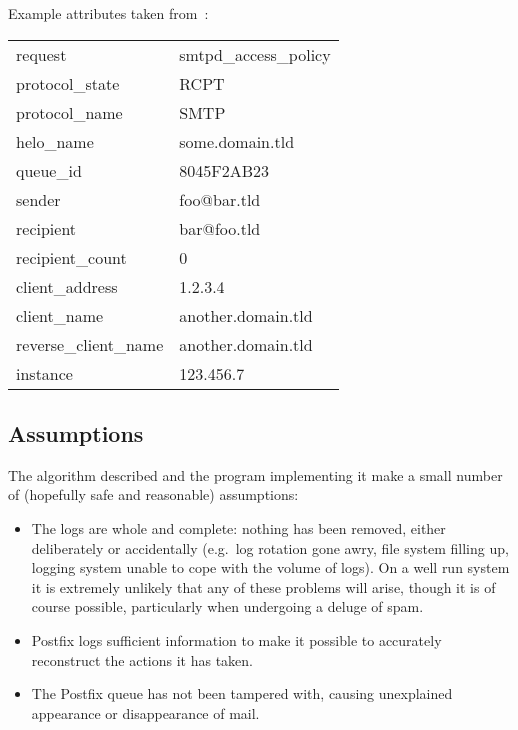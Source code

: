 \documentclass[a4paper,12pt,draft]{article}
\begin{document}
Example attributes taken from~\cite{policy-servers}:

\begin{tabular}[]{ll}

    request                 & smtpd\_access\_policy     \\
    protocol\_state         & RCPT                      \\
    protocol\_name          & SMTP                      \\
    helo\_name              & some.domain.tld           \\
    queue\_id               & 8045F2AB23                \\
    sender                  & foo@bar.tld               \\
    recipient               & bar@foo.tld               \\
    recipient\_count        & 0                         \\
    client\_address         & 1.2.3.4                   \\
    client\_name            & another.domain.tld        \\
    reverse\_client\_name   & another.domain.tld        \\
    instance                & 123.456.7                 \\

\end{tabular}



\subsection{Assumptions}

The algorithm described and the program implementing it make a small number
of (hopefully safe and reasonable) assumptions:

\begin{itemize}

    \item The logs are whole and complete: nothing has been removed, either
        deliberately or accidentally (e.g.\ log rotation gone awry, file
        system filling up, logging system unable to cope with the volume of
        logs).  On a well run system it is extremely unlikely that any of
        these problems will arise, though it is of course possible,
        particularly when undergoing a deluge of spam.

    \item Postfix logs sufficient information to make it possible to
        accurately reconstruct the actions it has taken.

    \item The Postfix queue has not been tampered with, causing unexplained
        appearance or disappearance of mail.

\end{itemize}
\end{document}
